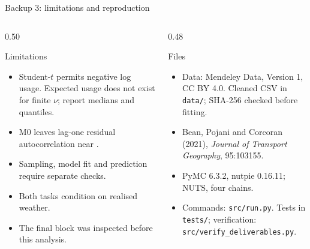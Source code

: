 \documentclass[aspectratio=169,11pt]{beamer}
\begin{document}
\begin{frame}{Backup 3: limitations and reproduction}
  \footnotesize
  \begin{columns}[T,onlytextwidth]
    \begin{column}{0.50\textwidth}
      \begin{block}{Limitations}
        \begin{itemize}
          \setlength{\itemsep}{0.06cm}
          \item Student-$t$ permits negative log usage. Expected usage does not exist for finite
            $\nu$; report medians and quantiles.
          \item M0 leaves lag-one residual autocorrelation near \MZeroDevOneLagOne.
          \item Sampling, model fit and prediction require separate checks.
          \item Both tasks condition on realised weather.
          \item The final block was inspected before this analysis.
        \end{itemize}
      \end{block}
    \end{column}
    \begin{column}{0.48\textwidth}
      \begin{block}{Files}
        \begin{itemize}
          \setlength{\itemsep}{0.06cm}
          \item Data: Mendeley Data, Version 1, CC BY 4.0.
            Cleaned CSV in \texttt{data/}; SHA-256 checked before fitting.
          \item Bean, Pojani and Corcoran (2021), \emph{Journal of Transport Geography}, 95:103155.
          \item PyMC 6.3.2, nutpie 0.16.11; NUTS, four chains.
          \item Commands: \texttt{src/run.py}. Tests in \texttt{tests/};
            verification: \texttt{src/verify\_deliverables.py}.
        \end{itemize}
      \end{block}
    \end{column}
  \end{columns}
\end{frame}
\end{document}
